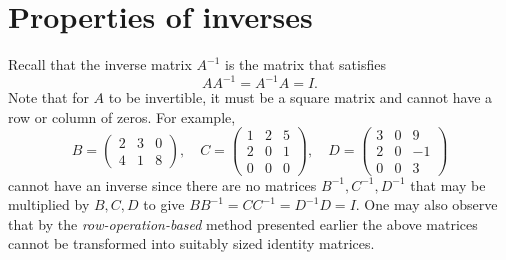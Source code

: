 \documentclass{ximera}
\begin{document}
\section{Properties of inverses}
Recall that the inverse matrix $A^{-1}$ is the matrix that satisfies
\begin{equation*}
AA^{-1}= A^{-1}A= I.
\end{equation*}
Note that for $A$ to be invertible, it must be a square matrix and cannot have a row or column of zeros. For example,
 \[B= \left(\begin{array}{ccc}
  2 &  3 & 0 \\
  4 &  1 & 8
\end{array}\right), \quad C= \left(\begin{array}{ccc}
  1 &  2 & 5 \\
  2 &  0 & 1 \\
  0 & 0& 0
\end{array}\right), \quad D = \left(\begin{array}{ccc}
  3 &  0 & 9 \\
  2 &  0 & -1 \\
  0 & 0& 3
\end{array}\right)
\]
cannot have an inverse since there are no matrices
$B^{-1}, C^{-1}, D^{-1}$ that may be multiplied by $B,C,D$ to give
$BB^{-1}= CC^{-1}=D^{-1}D=I$. One may also observe that by the
\textit{row-operation-based} method presented earlier
the above matrices cannot be transformed into suitably sized identity matrices.
\end{document}
